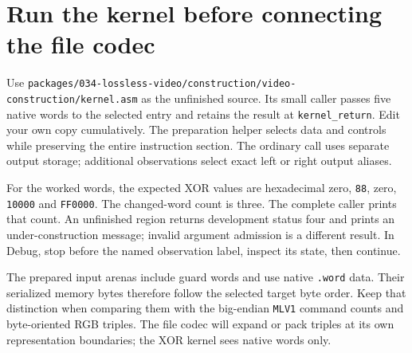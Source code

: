 \section{Run the kernel before connecting the file codec}
Use \texttt{packages/034-lossless-video/construction/video-construction/kernel.asm} as the unfinished source. Its small
caller passes five native words to the selected entry and retains the result at
\texttt{kernel\_return}. Edit your own copy cumulatively. The preparation helper
selects data and controls while preserving the entire instruction section.
The ordinary call uses separate output storage; additional observations select exact
left or right output aliases.

For the worked words, the expected XOR values are hexadecimal zero, \texttt{88},
zero, \texttt{10000} and \texttt{FF0000}. The changed-word count is three. The complete
caller prints that count. An unfinished region returns development status four and
prints an under-construction message; invalid argument admission is a different result.
In Debug, stop before the named observation label, inspect its state, then continue.

The prepared input arenas include guard words and use native \texttt{.word} data.
Their serialized memory bytes therefore follow the selected target byte order. Keep
that distinction when comparing them with the big-endian \texttt{MLV1} command counts
and byte-oriented RGB triples. The file codec will expand or pack triples at its own
representation boundaries; the XOR kernel sees native words only.
